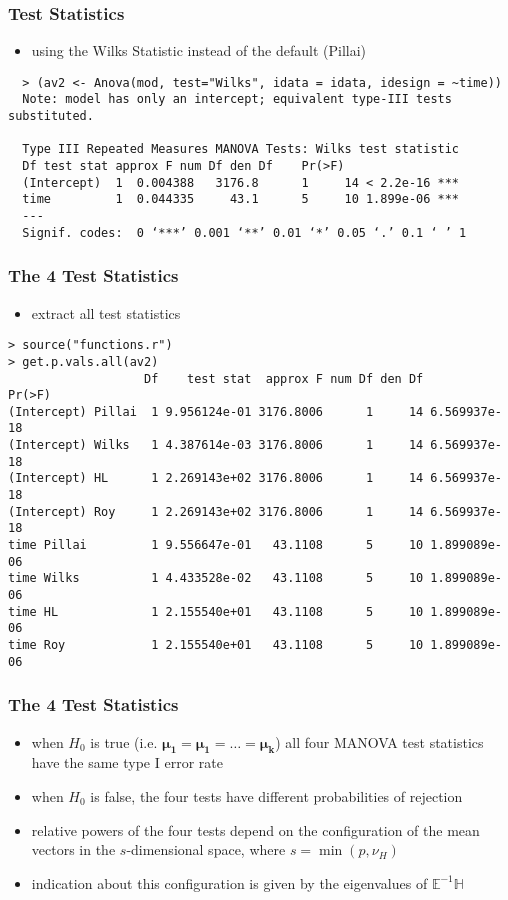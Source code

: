 \begin{frame}[fragile]\frametitle{Test Statistics}
  \begin{itemize}
  \item using the Wilks Statistic instead of the default (Pillai)
  \end{itemize}\scriptsize
\begin{verbatim}
  > (av2 <- Anova(mod, test="Wilks", idata = idata, idesign = ~time))
  Note: model has only an intercept; equivalent type-III tests substituted.

  Type III Repeated Measures MANOVA Tests: Wilks test statistic
  Df test stat approx F num Df den Df    Pr(>F)    
  (Intercept)  1  0.004388   3176.8      1     14 < 2.2e-16 ***
  time         1  0.044335     43.1      5     10 1.899e-06 ***
  ---
  Signif. codes:  0 ‘***’ 0.001 ‘**’ 0.01 ‘*’ 0.05 ‘.’ 0.1 ‘ ’ 1
\end{verbatim}
\end{frame}


\begin{frame}[fragile]\frametitle{The 4 Test Statistics}
  \begin{itemize}
  \item extract all test statistics
  \end{itemize}\scriptsize
\begin{verbatim}
> source("functions.r")
> get.p.vals.all(av2)
                   Df    test stat  approx F num Df den Df       Pr(>F)
(Intercept) Pillai  1 9.956124e-01 3176.8006      1     14 6.569937e-18
(Intercept) Wilks   1 4.387614e-03 3176.8006      1     14 6.569937e-18
(Intercept) HL      1 2.269143e+02 3176.8006      1     14 6.569937e-18
(Intercept) Roy     1 2.269143e+02 3176.8006      1     14 6.569937e-18
time Pillai         1 9.556647e-01   43.1108      5     10 1.899089e-06
time Wilks          1 4.433528e-02   43.1108      5     10 1.899089e-06
time HL             1 2.155540e+01   43.1108      5     10 1.899089e-06
time Roy            1 2.155540e+01   43.1108      5     10 1.899089e-06
\end{verbatim}
\end{frame}


\begin{frame}\frametitle{The 4 Test Statistics}
  \begin{itemize}
  \item when $H_0$ is true (i.e. $\mathbf{\mu_1} = \mathbf{\mu_1} = \ldots =  \mathbf{\mu_k}$) all four MANOVA test statistics have the same type I error rate
  \item when $H_0$ is false, the four tests have different probabilities of rejection
  \item relative powers of the four tests depend on the configuration of the mean vectors in the $s$-dimensional space, where $s=\min(p,\nu_H)$
  \item indication about this configuration is given by the eigenvalues of $\mathbb{E}^{-1}\mathbb{H}$
  \end{itemize}\scriptsize
\end{frame}

